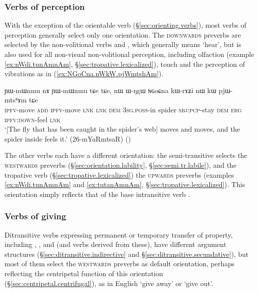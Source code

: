 \subsubsection{Verbs of perception}  \label{sec:preverb.perception} 
With the exception of the orientable verb  (§\ref{sec:orienting.verbs}), most verbs of perception generally select only one orientation. The  \textsc{downwards} preverbs are selected by the non-volitional  verbs  and , which generally means `hear', but is also used for all non-visual  non-volitional perception, including olfaction (example \ref{ex:nWdi.tunAmnAm}, §\ref{sec:tropative.lexicalized}), touch and the perception of vibrations as in  (\ref{ex:NGoCna.nWkW.pjWmtshAm}).
 
\begin{exe}
\ex \label{ex:NGoCna.nWkW.pjWmtshAm}
\gll ɲɯ-mɯnmu nɤ ɲɯ-mɯnmu tɕe tɕe, nɯ ɯ-ŋgɯ ɴɢoɕna kɯ-rɤʑi nɯ kɯ pjɯ-mtsʰɤm tɕe  \\
\textsc{ipfv}-move \textsc{add} \textsc{ipfv}-move  \textsc{lnk} \textsc{lnk} \textsc{dem} \textsc{3sg}.\textsc{poss}-in spider \textsc{sbj}:\textsc{pcp}-stay \textsc{dem} \textsc{erg} \textsc{ipfv}:\textsc{down}-feel \textsc{lnk} \\
\glt `[The fly that has been caught in the spider's web] moves and moves, and the spider inside feels it.' (26-mYaRmtsaR)
()
\end{exe}

The other verbs each have a different orientation: the semi-transitive  selects the \textsc{westwards} preverbs (§\ref{sec:orientation.lability}, §\ref{sec:semi.tr.labile}), and the tropative verb  (§\ref{sec:tropative.lexicalized}) the \textsc{upwards} preverbs (examples \ref{ex:nWdi.tunAmnAm} and \ref{ex:tutanAmnAm}, §\ref{sec:tropative.lexicalized}). This orientation simply reflects that of the base intransitive verb .

\subsubsection{Verbs of giving} \label{sec:preverb.giving}
Ditransitive verbs expressing permanent or temporary transfer of property, including ,  ,  and  (and verbs derived from these), have different argument structures (§\ref{sec:ditransitive.indirective} and §\ref{sec:ditransitive.secundative}), but most of them select the \textsc{westwards} preverbs as default orientation, perhaps reflecting the centripetal function of this orientation (§\ref{sec:centripetal.centrifugal}), as in English `give away' or `give out'.

